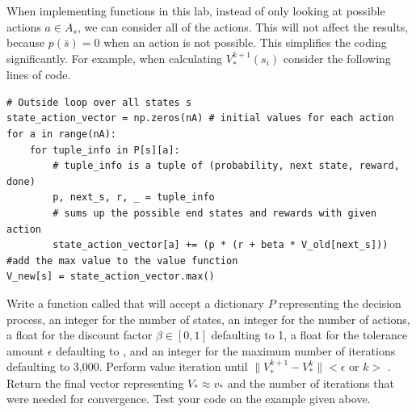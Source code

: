 When implementing functions in this lab, instead of only looking at possible actions $a\in A_s$, we can consider all of the actions.
This will not affect the results, because $p(\bar{s}) = 0$ when an action is not possible.
This simplifies the coding significantly.
For example, when calculating $V_*^{k+1}(s_i)$ consider the following lines of code.

\begin{lstlisting}
# Outside loop over all states s
state_action_vector = np.zeros(nA) # initial values for each action
for a in range(nA):
    for tuple_info in P[s][a]:
        # tuple_info is a tuple of (probability, next state, reward, done)
        p, next_s, r, _ = tuple_info
        # sums up the possible end states and rewards with given action
        state_action_vector[a] += (p * (r + beta * V_old[next_s]))
#add the max value to the value function
V_new[s] = state_action_vector.max()
\end{lstlisting}


\begin{problem}
\label{prob:policyiter-value1}
Write a function called  that will accept a dictionary $P$ representing the decision process, an integer for the number of states, an integer for the number of actions, a float for the discount factor $\beta \in [0,1]$ defaulting to 1, a float for the tolerance amount $\epsilon$ defaulting to , and an integer for the maximum number of iterations  defaulting to 3,000.
Perform value iteration until $\|V_*^{k+1} - V_*^{k}\| < \epsilon$ or $k > $ .
Return the final vector representing $V_*\approx v_*$ and the number of iterations that were needed for convergence.
Test your code on the example given above.
\end{problem}

